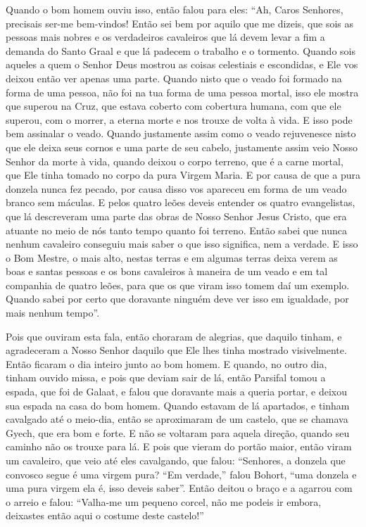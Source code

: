 Quando o bom homem ouviu isso, então falou para eles: “Ah, Caros Senhores,
precisais ser-me bem-vindos! Então sei bem por aquilo que me dizeis, que sois
as pessoas mais nobres e os verdadeiros cavaleiros que lá devem levar a fim a
demanda do Santo Graal e que lá padecem o trabalho e o tormento. Quando sois
aqueles a quem o Senhor Deus mostrou as coisas celestiais e escondidas, e Ele
vos deixou então ver apenas uma parte. Quando nisto que o veado foi formado na
forma de uma pessoa, não foi na tua forma de uma pessoa mortal, isso ele mostra
que superou na Cruz, que estava coberto com cobertura humana, com que ele
superou, com o morrer, a eterna morte e nos trouxe de volta à vida. E isso pode
bem assinalar o veado. Quando justamente assim como o veado rejuvenesce nisto
que ele deixa seus cornos e uma parte de seu cabelo, justamente assim veio
Nosso Senhor da morte à vida, quando deixou o corpo terreno, que é a carne
mortal, que Ele tinha tomado no corpo da pura Virgem Maria. E por causa de que
a pura donzela nunca fez pecado, por causa disso vos apareceu em forma de um
veado branco sem máculas. E pelos quatro leões deveis entender os quatro
evangelistas, que lá descreveram uma parte das obras de Nosso Senhor Jesus
Cristo, que era atuante no meio de nós  tanto tempo quanto foi terreno. Então
sabei que nunca nenhum cavaleiro conseguiu mais saber o que isso significa, nem
a verdade. E isso o Bom Mestre, o mais alto, nestas terras e em algumas terras
deixa verem as boas e santas pessoas e os bons cavaleiros à maneira de um veado
e em tal companhia de quatro leões, para que os que viram isso tomem daí um
exemplo. Quando sabei por certo que doravante ninguém deve ver isso em
igualdade, por mais nenhum tempo”. 

Pois que ouviram esta fala, então choraram de alegrias, que daquilo tinham, e
agradeceram a Nosso Senhor daquilo que Ele lhes tinha mostrado visivelmente.
Então ficaram o dia inteiro junto ao bom homem. E quando, no outro dia, tinham
ouvido missa, e pois que deviam sair de lá, então Parsifal tomou a espada, que
foi de Galaat, e falou que doravante mais a queria portar, e deixou sua espada
na casa do bom homem. Quando estavam de lá apartados, e tinham cavalgado até o
meio-dia, então se aproximaram de um castelo, que se chamava Gyech, que era bom
e forte. E não se voltaram para aquela direção, quando seu caminho não os
trouxe para lá. E pois que vieram do portão maior, então viram um cavaleiro,
que veio até eles cavalgando, que falou: “Senhores, a donzela que convosco
segue é uma virgem pura? “Em verdade,” falou Bohort, “uma donzela e uma pura
virgem ela é, isso deveis saber”. Então deitou o braço e a agarrou com o arreio
e falou: “Valha-me um pequeno corcel, não me podeis ir embora, deixastes então
aqui o costume deste castelo!” 

